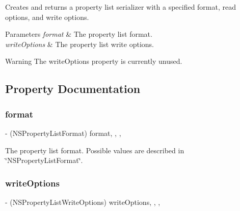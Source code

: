 Creates and returns a property list serializer with a specified format, read options, and write options.


\begin{DoxyParams}{Parameters}
{\em format} & The property list format. \\
\hline
{\em write\+Options} & The property list write options.\\
\hline
\end{DoxyParams}
\begin{DoxyWarning}{Warning}
The {\ttfamily write\+Options} property is currently unused. 
\end{DoxyWarning}


\subsection{Property Documentation}
\mbox{\label{interface_a_f_property_list_request_serializer_a7caf5c4c62553db952c3f8dca8cf5b5f}} 
\subsubsection{\texorpdfstring{format}{format}}
{\footnotesize\ttfamily -\/ (N\+S\+Property\+List\+Format) format\hspace{0.3cm}{\ttfamily [read]}, {\ttfamily [write]}, {\ttfamily [nonatomic]}, {\ttfamily [assign]}}

The property list format. Possible values are described in \char`\"{}\+N\+S\+Property\+List\+Format\char`\"{}. \mbox{\label{interface_a_f_property_list_request_serializer_a15d74e1c93bc158815a46aa351e6fb79}} 
\subsubsection{\texorpdfstring{write\+Options}{writeOptions}}
{\footnotesize\ttfamily -\/ (N\+S\+Property\+List\+Write\+Options) write\+Options\hspace{0.3cm}{\ttfamily [read]}, {\ttfamily [write]}, {\ttfamily [nonatomic]}, {\ttfamily [assign]}}

